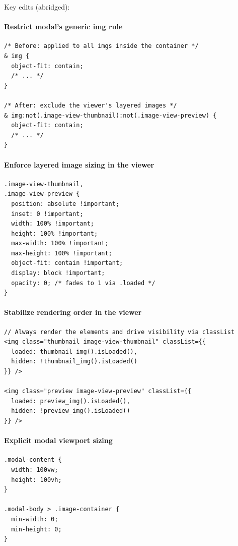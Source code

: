 \documentclass[11pt]{article}
\begin{document}
Key edits (abridged):

\paragraph{Restrict modal's generic img rule}
\begin{verbatim}
/* Before: applied to all imgs inside the container */
& img {
  object-fit: contain;
  /* ... */
}

/* After: exclude the viewer's layered images */
& img:not(.image-view-thumbnail):not(.image-view-preview) {
  object-fit: contain;
  /* ... */
}
\end{verbatim}

\paragraph{Enforce layered image sizing in the viewer}
\begin{verbatim}
.image-view-thumbnail,
.image-view-preview {
  position: absolute !important;
  inset: 0 !important;
  width: 100% !important;
  height: 100% !important;
  max-width: 100% !important;
  max-height: 100% !important;
  object-fit: contain !important;
  display: block !important;
  opacity: 0; /* fades to 1 via .loaded */
}
\end{verbatim}

\paragraph{Stabilize rendering order in the viewer}
\begin{verbatim}
// Always render the elements and drive visibility via classList
<img class="thumbnail image-view-thumbnail" classList={{
  loaded: thumbnail_img().isLoaded(),
  hidden: !thumbnail_img().isLoaded()
}} />

<img class="preview image-view-preview" classList={{
  loaded: preview_img().isLoaded(),
  hidden: !preview_img().isLoaded()
}} />
\end{verbatim}

\paragraph{Explicit modal viewport sizing}
\begin{verbatim}
.modal-content {
  width: 100vw;
  height: 100vh;
}

.modal-body > .image-container {
  min-width: 0;
  min-height: 0;
}
\end{verbatim}
\end{document}
